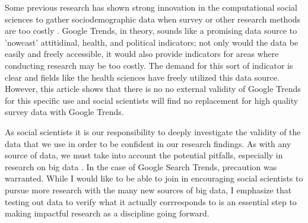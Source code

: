 Some previous research has shown strong innovation in the computational social sciences
to gather sociodemographic data when survey or other research methods are too costly
\citep{blumenstockPredictingPovertyWealth2015}. Google Trends, in theory, sounds like 
a promising data source to 'nowcast' attitidinal, health, and political indicators;
not only would the data be easily and freely accessible, it would also provide 
indicators for areas where conducting research may be too costly. The demand for this 
sort of indicator is clear and fields like the health sciences have freely utilized
this data source. However, this article shows that there is no 
no external validity of Google Trends for this specific use and social scientists
will find no replacement for high quality survey data with Google Trends. 

As social scientists it is our responsibility to deeply investigate the validity 
of the data that we use in order to be confident in our research findings. As with any
source of data, we must take into account the potential pitfalls, especially in research on big data
\citep{mcfarlandBigDataDanger2015}. In the case of Google Search Trends, precaution was 
warranted. While I would like to be able to join \citet{bailCulturalEnvironmentMeasuring2014} 
in encouraging social scientists to pursue more research with the many new sources of big data, 
I emphasize that testing out data to verify what it actually corrresponds to is an essential step 
to making impactful research as a discipline going forward.  